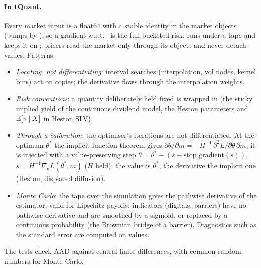 \paragraph{In tQuant.} Every market input is a float64  with a stable identity in the market objects
(bumps by ), so a gradient w.r.t.\  is the full bucketed risk.
 runs  under a tape and keeps it on ;
pricers read the market only through its objects and never detach values. Patterns:
\begin{itemize}[nosep]
  \item \emph{Locating, not differentiating}: interval searches (interpolation, vol nodes, kernel bins) act on
         copies; the derivative flows through the interpolation weights.
  \item \emph{Risk conventions}: a quantity deliberately held fixed is wrapped in  (the sticky
        implied yield of the continuous dividend model, the Heston parameters and $\mathbb{E}[v \mid X]$ in Heston SLV).
  \item \emph{Through a calibration}: the optimiser's iterations are not differentiated. At the optimum $\theta^*$ the
        implicit function theorem gives $\partial\theta/\partial m = -H^{-1}\,\partial^2 L/\partial\theta\,\partial m$; it is injected
        with a value-preserving step $\theta = \theta^* - (s - \mathrm{stop\_gradient}(s))$, $s = H^{-1}\nabla_\theta L(\theta^*, m)$
        ($H$ held): the value is $\theta^*$, the derivative the implicit one (Heston, displaced diffusion).
  \item \emph{Monte Carlo}: the tape over the simulation gives the pathwise derivative of the estimator, valid for
        Lipschitz payoffs; indicators (digitals, barriers) have no pathwise derivative and are smoothed by a sigmoid,
        or replaced by a continuous probability (the Brownian bridge of a barrier). Diagnostics such as the standard error
        are computed on  values.
\end{itemize}
The tests check AAD against central finite differences, with common random numbers for Monte Carlo.
